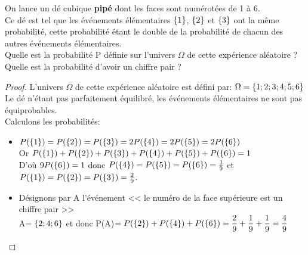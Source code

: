 \begin{exercice}
On lance un dé cubique  \textbf{pipé} dont les faces sont numérotées de 1 à  6. \\  Ce dé est tel que les événements élémentaires $ \left\{1\right\} $, $ \left\{2\right\} $ et $ \left\{3\right\} $ ont la même probabilité, cette probabilité étant le double de la probabilité de chacun des autres événements élémentaires.\\ Quelle est la probabilité P définie sur l'univers $ \Omega  $ de cette expérience aléatoire ? \\ Quelle est la probabilité  d'avoir un chiffre pair ?
\end{exercice}
\begin{proof}
L'univers $ \Omega  $ de cette expérience aléatoire est défini par: $ \Omega =\left\{1; 2; 3; 4; 5; 6 \right\}$\\Le dé n'étant pas parfaitement équilibré, les événements élémentaires ne sont pas équiprobables.\\Calculons les probabilités:
\begin{itemize}
\item  $ P( \left\{1\right\})=P (\left\{2\right\})=P (\left\{3\right\})=2P( \left\{4\right\})=2P( \left\{5\right\})=2P (\left\{6\right\}) $\\
  Or $ P (\left\{1\right\})+P (\left\{2\right\})+P (\left\{3\right\})+P (\left\{4\right\})+P (\left\{5\right\})+P( \left\{6\right\})=1 $\\
  D'où $ 9 P( \left\{6\right\})=1 $ donc $P( \left\{4\right\})=P (\left\{5\right\})=P (\left\{6\right\} ) 
 =\tfrac{1}{9}$ et $P (\left\{1\right\})=P (\left\{2\right\})=P (\left\{3\right\} ) 
 =\frac{2}{9}$.
 \item Désignons par A l'événement << le numéro de la face supérieure est un chiffre pair >>\\ A$ =\left\{2; 4; 6\right\} $  et donc P(A)$ =P( \left\{2\right\})+P (\left\{4\right\})+P (\left\{6\right\}) =\dfrac{2}{9}+\dfrac{1}{9}+\dfrac{1}{9}=\dfrac{4}{9}$
 \end{itemize}
 \end{proof}
  
